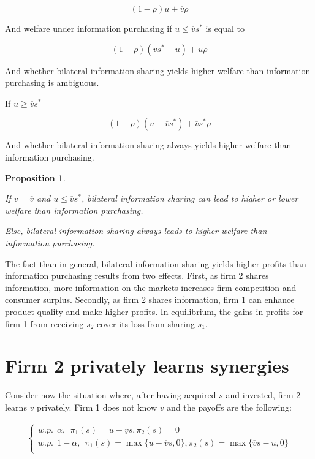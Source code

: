 \documentclass[a4paper,leqno]{article}%
\newtheorem{prop}{Proposition}
\renewcommand{\a}{\alpha}
\newcommand{\uv}{\underline{v}}
\newcommand{\ov}{\overline{v}}
\begin{document}
\medskip

\[
(1-\rho) u +\ov \rho
\]

\medskip

And welfare under information purchasing if $u\leq \ov s^*$ is equal to

\medskip

\[
(1-\rho) (\ov s^*-u)+u\rho
\]

\medskip

And whether bilateral information sharing yields higher welfare than information purchasing is ambiguous.

\medskip

If $u\geq \ov s^*$ 

\[
(1-\rho) (u-\ov s^*)+\ov s^*\rho
\]

And whether bilateral information sharing always yields higher welfare than information purchasing.


\medskip

\begin{prop}~~

If $v=\ov$ and $u\leq \ov s^*$, bilateral information sharing can lead to higher or lower welfare than information purchasing. 

Else, bilateral information sharing always leads to higher welfare than information purchasing.

\end{prop}

\medskip

The fact than in general, bilateral information sharing yields higher profits than information purchasing results from two effects. First, as firm 2 shares information, more information on the markets increases firm competition and consumer surplus. Secondly, as firm 2 shares information, firm 1 can enhance product quality and make higher profits. In equilibrium, the gains in profits for firm 1 from receiving $s_2$ cover its loss from sharing $s_1$. 

\medskip

\section{Firm 2 privately learns synergies}

Consider now the situation where, after having acquired $s$ and invested, firm 2 learns $v$ privately. Firm 1 does not know $v$ and the payoffs are the following:


\begin{align}\label{compbilmixed}
\begin{cases}
    w.p.~~ \a,~~ \pi_1(s)=u-\uv s, \pi_2(s)=0\\ 
    w.p.~~ 1-\a,~~ \pi_1(s)=\max\{u-\ov s,0\}, \pi_2(s)=\max\{\ov s-u,0\}\\ 
\end{cases}
\end{align}
\end{document}
